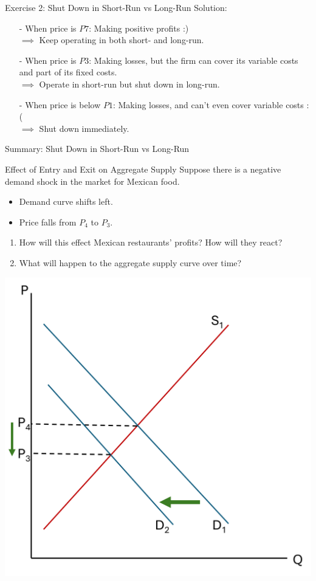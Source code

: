 \documentclass[9pt, handout]{beamer}
\begin{document}
\begin{frame}{Exercise 2: Shut Down in Short-Run vs Long-Run}
    Solution: 
    \vspace{10pt}
    \begin{itemize}
        \item[-] When price is $P7$: Making positive profits :) \\
        $\implies$ Keep operating in both short- and long-run.
        \vspace{10pt}
        \item[-] When price is $P3$: Making losses, but the firm can cover its variable costs and part of its fixed costs. \\
        $\implies$ Operate in short-run but shut down in long-run.
        \vspace{10pt}
        \item[-] When price is below $P1$: Making losses, and can't even cover variable costs :(\\
        $\implies$ Shut down immediately.
    \end{itemize}
    \vspace{1.5in}
\end{frame}

\begin{frame}{Summary: Shut Down in Short-Run vs Long-Run}
    
    \vspace{1.5in}
\end{frame}

\begin{frame}{Effect of Entry and Exit on Aggregate Supply}
    Suppose there is a negative demand shock in the market for Mexican food.
    \begin{itemize}
        \item Demand curve shifts left.
        \item Price falls from $P_4$ to $P_3$.
    \end{itemize}
    \begin{enumerate}
        \item How will this effect Mexican restaurants' profits? How will they react?
        \item What will happen to the aggregate supply curve over time?
    \end{enumerate}
    \includegraphics[width=.5\linewidth]{demand_falls.png}
\end{frame}
\end{document}
